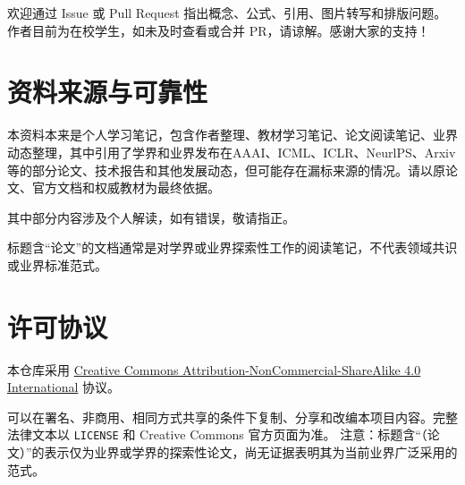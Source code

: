 欢迎通过 Issue 或 Pull Request 指出概念、公式、引用、图片转写和排版问题。作者目前为在校学生，如未及时查看或合并 PR，请谅解。感谢大家的支持！

\hypertarget{ux8d44ux6599ux6765ux6e90ux4e0eux53efux9760ux6027}{%
\section{资料来源与可靠性}\label{ux8d44ux6599ux6765ux6e90ux4e0eux53efux9760ux6027}}

本资料本来是个人学习笔记，包含作者整理、教材学习笔记、论文阅读笔记、业界动态整理，其中引用了学界和业界发布在AAAI、ICML、ICLR、NeurlPS、Arxiv等的部分论文、技术报告和其他发展动态，但可能存在漏标来源的情况。请以原论文、官方文档和权威教材为最终依据。

其中部分内容涉及个人解读，如有错误，敬请指正。

标题含``论文''的文档通常是对学界或业界探索性工作的阅读笔记，不代表领域共识或业界标准范式。

\hypertarget{ux8bb8ux53efux534fux8bae}{%
\section{许可协议}\label{ux8bb8ux53efux534fux8bae}}

本仓库采用 \href{https://creativecommons.org/licenses/by-nc-sa/4.0/}{Creative Commons Attribution-NonCommercial-ShareAlike 4.0 International} 协议。

可以在署名、非商用、相同方式共享的条件下复制、分享和改编本项目内容。完整法律文本以 \texttt{LICENSE} 和 Creative Commons 官方页面为准。
注意：标题含``（论文）''的表示仅为业界或学界的探索性论文，尚无证据表明其为当前业界广泛采用的范式。

\clearpage
